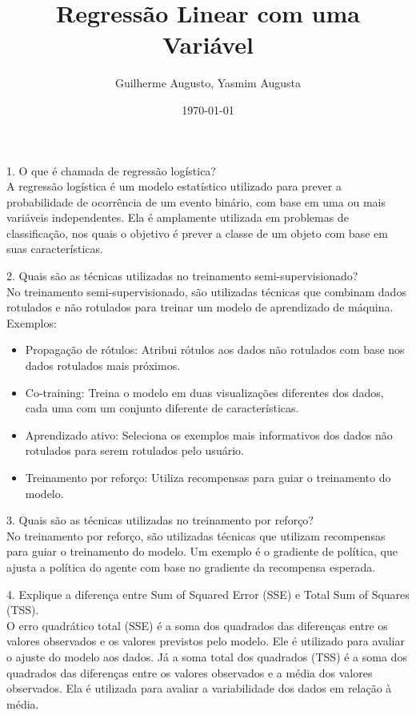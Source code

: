 \documentclass[12pt,a4paper]{article}
\title{Regressão Linear com uma Variável}
\author{Guilherme Augusto, Yasmim Augusta}
\date{\today}
\begin{document}
\maketitle

1. O que é chamada de regressão logística?\\

A regressão logística é um modelo estatístico utilizado para prever a probabilidade de ocorrência de um evento binário, com base em uma ou mais variáveis independentes. Ela é amplamente utilizada em problemas de classificação, nos quais o objetivo é prever a classe de um objeto com base em suas características.

\vspace{1cm}

2. Quais são as técnicas utilizadas no treinamento semi-supervisionado?\\

No treinamento semi-supervisionado, são utilizadas técnicas que combinam dados rotulados e não rotulados para treinar um modelo de aprendizado de máquina. Exemplos:
\begin{itemize}
    \item Propagação de rótulos: Atribui rótulos aos dados não rotulados com base nos dados rotulados mais próximos.
    \item Co-training: Treina o modelo em duas visualizações diferentes dos dados, cada uma com um conjunto diferente de características.
    \item Aprendizado ativo: Seleciona os exemplos mais informativos dos dados não rotulados para serem rotulados pelo usuário.
    \item Treinamento por reforço: Utiliza recompensas para guiar o treinamento do modelo.
\end{itemize}

\vspace{1cm}

3. Quais são as técnicas utilizadas no treinamento por reforço?\\

No treinamento por reforço, são utilizadas técnicas que utilizam recompensas para guiar o treinamento do modelo. Um exemplo é o gradiente de política, que ajusta a política do agente com base no gradiente da recompensa esperada.

\vspace{1cm}

4. Explique a diferença entre Sum of Squared Error (SSE) e Total Sum of Squares (TSS).\\

O erro quadrático total (SSE) é a soma dos quadrados das diferenças entre os valores observados e os valores previstos pelo modelo. Ele é utilizado para avaliar o ajuste do modelo aos dados. Já a soma total dos quadrados (TSS) é a soma dos quadrados das diferenças entre os valores observados e a média dos valores observados. Ela é utilizada para avaliar a variabilidade dos dados em relação à média.
\end{document}
